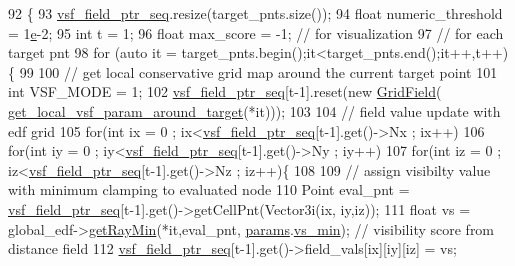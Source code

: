 \begin{DoxyCode}
92                                                                                             \{
93     \hyperlink{class_preplanner_aab0f91e34b86eaa581c7642ba5059308}{vsf\_field\_ptr\_seq}.resize(target\_pnts.size());
94     \textcolor{keywordtype}{float} numeric\_threshold = 1\hyperlink{namespace__setup__util_acdce690b925de33d6249bbbfa1109d61}{e}-2;
95     \textcolor{keywordtype}{int} t = 1;
96     \textcolor{keywordtype}{float} max\_score = -1;  \textcolor{comment}{// for visualization }
97     \textcolor{comment}{// for each target pnt}
98     \textcolor{keywordflow}{for} (\textcolor{keyword}{auto} it = target\_pnts.begin();it<target\_pnts.end();it++,t++)\{
99         
100         \textcolor{comment}{// get local conservative grid map around the current target point}
101         \textcolor{keywordtype}{int} VSF\_MODE = 1;
102         \hyperlink{class_preplanner_aab0f91e34b86eaa581c7642ba5059308}{vsf\_field\_ptr\_seq}[t-1].reset(\textcolor{keyword}{new} \hyperlink{struct_grid_field}{GridField}(
      \hyperlink{class_preplanner_a5b038984427471115b1f4be24abf43b0}{get\_local\_vsf\_param\_around\_target}(*it))); 
103         
104         \textcolor{comment}{// field value update with edf grid }
105         \textcolor{keywordflow}{for}(\textcolor{keywordtype}{int} ix = 0 ; ix<\hyperlink{class_preplanner_aab0f91e34b86eaa581c7642ba5059308}{vsf\_field\_ptr\_seq}[t-1].get()->Nx ; ix++)
106             \textcolor{keywordflow}{for}(\textcolor{keywordtype}{int} iy = 0 ; iy<\hyperlink{class_preplanner_aab0f91e34b86eaa581c7642ba5059308}{vsf\_field\_ptr\_seq}[t-1].get()->Ny ; iy++)
107                 \textcolor{keywordflow}{for}(\textcolor{keywordtype}{int} iz = 0 ; iz<\hyperlink{class_preplanner_aab0f91e34b86eaa581c7642ba5059308}{vsf\_field\_ptr\_seq}[t-1].get()->Nz ; iz++)\{
108                     
109                     \textcolor{comment}{// assign visibilty value with minimum clamping to evaluated node }
110                     Point eval\_pnt = \hyperlink{class_preplanner_aab0f91e34b86eaa581c7642ba5059308}{vsf\_field\_ptr\_seq}[t-1].get()->getCellPnt(Vector3i(ix,
      iy,iz));      
111                     \textcolor{keywordtype}{float} vs = global\_edf->\hyperlink{struct_grid_field_af9f5144af2f0cdb99784ea54c42a8516}{getRayMin}(*it,eval\_pnt,
      \hyperlink{class_preplanner_a679cc4b70f041aff73769e7ec92dc5d0}{params}.\hyperlink{structchaser_1_1_preplanner_params_a2abe7915546a5d2ebde667a1d5ccfb44}{vs\_min}); \textcolor{comment}{// visibility score from distance field                    }
112                     \hyperlink{class_preplanner_aab0f91e34b86eaa581c7642ba5059308}{vsf\_field\_ptr\_seq}[t-1].get()->field\_vals[ix][iy][iz] = vs;

\end{DoxyCode}
